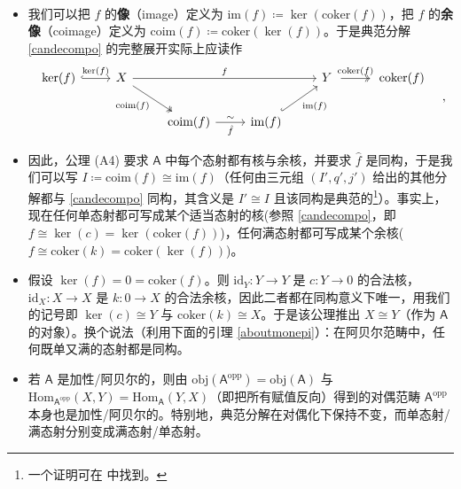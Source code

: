
\begin{Rem}
	\ \vspace*{0.0cm}
	\begin{itemize}[leftmargin=0.5cm]
		\item 我们可以把 $f$ 的\textbf{像}（image）定义为 $\text{im}(f)\coloneqq\ker(\text{coker}(f))$，把 $f$ 的\textbf{余像}（coimage）定义为 $\text{coim}(f)\coloneqq\text{coker}(\ker(f))$。于是典范分解 \eqref{candecompo} 的完整展开实际上应读作
		\[
		\begin{tikzcd}
			\ker(f)\arrow[r, hook, "\ker(f)"] & X\arrow[rrr, "f"]\arrow[dr, two heads, "\text{coim}(f)"'] & & & Y\;\arrow[r, two heads, "\text{coker}(f)"] & \;\text{coker}(f) \\
			& & \text{coim}(f)\arrow[r, "\hat{f}"', "\sim"] & \text{im}(f)\arrow[ur, hook, "\text{im}(f)"'] & & 
		\end{tikzcd}\quad,
		\]

		\item 因此，公理 (A4) 要求 $\mathsf{A}$ 中每个态射都有核与余核，并要求 $\hat{f}$ 是同构，于是我们可以写 $I\coloneqq\text{coim}(f)\cong\text{im}(f)$（任何由三元组 $(I',q',j')$ 给出的其他分解都与 \eqref{candecompo} 同构，其含义是 $I'\cong I$ 且该同构是典范的\footnote{一个证明可在 \cite[Proposition VIII.3.1]{[Mac78]} 中找到。}）。事实上，现在任何单态射都可写成某个适当态射的核\big(参照 \eqref{candecompo}，即 $f\cong\ker(c)=\ker(\text{coker}(f))$\big)，任何满态射都可写成某个余核\big($f\cong\text{coker}(k)=\text{coker}(\ker(f))$\big)。

		\item 假设 $\ker(f)=0=\text{coker}(f)$。则 $\text{id}_Y:Y\rightarrow Y$ 是 $c:Y\rightarrow 0$ 的合法核，$\text{id}_X:X\rightarrow X$ 是 $k:0\rightarrow X$ 的合法余核，因此二者都在同构意义下唯一，用我们的记号即 $\ker(c)\cong Y$ 与 $\text{coker}(k)\cong X$。于是该公理推出 $X\cong Y$（作为 $\mathsf{A}$ 的对象）。换个说法（利用下面的引理 \ref{aboutmonepi}）：在阿贝尔范畴中，任何既单又满的态射都是同构。

		\item 若 $\mathsf{A}$ 是加性/阿贝尔的，则由 $\text{obj}(\mathsf{A}^\text{opp})=\text{obj}(\mathsf{A})$ 与 $\text{Hom}_{\mathsf{A}^\text{opp}}(X,Y)=\text{Hom}_\mathsf{A}(Y,X)$（即把所有赋值反向）得到的对偶范畴 $\mathsf{A}^\text{opp}$ 本身也是加性/阿贝尔的。特别地，典范分解在对偶化下保持不变，而单态射/满态射分别变成满态射/单态射。
	\end{itemize}
\end{Rem}

